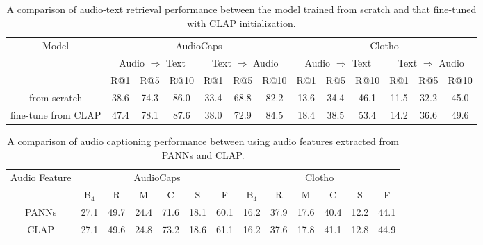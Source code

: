 \documentclass[sigconf,anonymous,review]{acmart}
\begin{document}
\begin{table}[ht]
    \centering
    \begin{tabular}{c||cccccc||cccccc}
    \toprule
    \multirow{3}{*}{Model} & \multicolumn{6}{c||}{AudioCaps} & \multicolumn{6}{c}{Clotho} \\
    \cline{2-13}
     & \multicolumn{3}{c}{Audio $\Rightarrow$ Text} & \multicolumn{3}{c||}{Text $\Rightarrow$ Audio} & \multicolumn{3}{c}{Audio $\Rightarrow$ Text} & \multicolumn{3}{c}{Text $\Rightarrow$ Audio} \\
     & R@1 & R@5 & R@10 & R@1 & R@5 & R@10 & R@1  & R@5 & R@10 & R@1 & R@5 & R@10\\
    \midrule
    from scratch & 38.6 & 74.3 & 86.0 & 33.4 & 68.8 & 82.2 & 13.6 & 34.4 & 46.1 & 11.5 & 32.2 & 45.0\\
    fine-tune from CLAP & 47.4 & 78.1 & 87.6 & 38.0 & 72.9 & 84.5 & 18.4 & 38.5 & 53.4 & 14.2 & 36.6 & 49.6\\
    \bottomrule
    \end{tabular}
     \caption{A comparison of audio-text retrieval performance between the model trained from scratch and that fine-tuned with CLAP initialization.}
    \label{tab:retrieval_finetune}
\end{table}

\begin{table}[ht]
    \centering
    \begin{tabular}{c||cccccc||cccccc}
    \toprule
    \multirow{2}{*}{Audio Feature} & \multicolumn{6}{c||}{AudioCaps} & \multicolumn{6}{c}{Clotho} \\
    \cline{2-13}
     & $\text{B}_4$ & R & M & C & S & F & $\text{B}_4$ & R & M & C & S & F\\
    \midrule
    PANNs & 27.1 & 49.7 & 24.4 & 71.6 & 18.1 & 60.1 & 16.2 & 37.9 & 17.6 & 40.4 & 12.2 & 44.1\\
    CLAP  & 27.1 & 49.6 & 24.8 & 73.2 & 18.6 & 61.1 & 16.2 & 37.6 & 17.8 & 41.1 & 12.8 & 44.9\\
    \bottomrule
    \end{tabular}
     \caption{A comparison of audio captioning performance between using audio features extracted from PANNs and CLAP.}
    \label{tab:caption_finetune}
\end{table}
\end{document}
